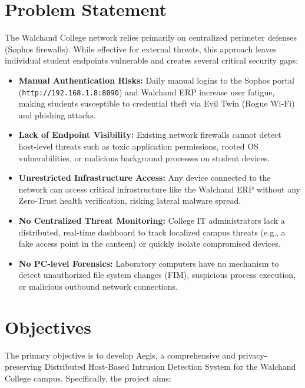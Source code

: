 \documentclass[12pt,a4paper]{report}
\begin{document}
\chapter{Problem Statement}

The Walchand College network relies primarily on centralized perimeter defenses (Sophos firewalls). While effective for external threats, this approach leaves individual student endpoints vulnerable and creates several critical security gaps:

\begin{itemize}[leftmargin=*, noitemsep]
  \item \textbf{Manual Authentication Risks:} Daily manual logins to the Sophos portal (\texttt{http://192.168.1.8:8090}) and Walchand ERP increase user fatigue, making students susceptible to credential theft via Evil Twin (Rogue Wi-Fi) and phishing attacks.

  \item \textbf{Lack of Endpoint Visibility:} Existing network firewalls cannot detect host-level threats such as toxic application permissions, rooted OS vulnerabilities, or malicious background processes on student devices.

  \item \textbf{Unrestricted Infrastructure Access:} Any device connected to the network can access critical infrastructure like the Walchand ERP without any Zero-Trust health verification, risking lateral malware spread.

  \item \textbf{No Centralized Threat Monitoring:} College IT administrators lack a distributed, real-time dashboard to track localized campus threats (e.g., a fake access point in the canteen) or quickly isolate compromised devices.

  \item \textbf{No PC-level Forensics:} Laboratory computers have no mechanism to detect unauthorized file system changes (FIM), suspicious process execution, or malicious outbound network connections.
\end{itemize}

\chapter{Objectives}

The primary objective is to develop Aegis, a comprehensive and privacy-preserving Distributed Host-Based Intrusion Detection System for the Walchand College campus. Specifically, the project aims:
\end{document}
